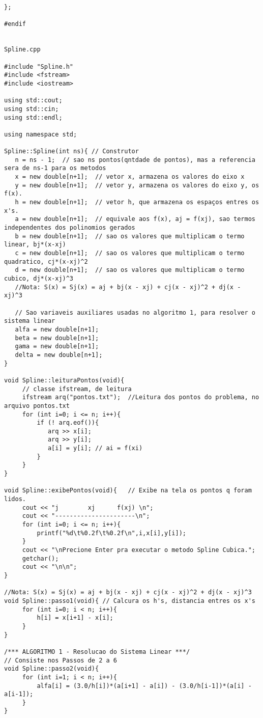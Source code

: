 \begin{verbatim}
};

#endif


Spline.cpp

#include "Spline.h"
#include <fstream>
#include <iostream>

using std::cout;
using std::cin;
using std::endl;

using namespace std;

Spline::Spline(int ns){ // Construtor
   n = ns - 1;  // sao ns pontos(qntdade de pontos), mas a referencia sera de ns-1 para os metodos
   x = new double[n+1];  // vetor x, armazena os valores do eixo x   
   y = new double[n+1];  // vetor y, armazena os valores do eixo y, os f(x).
   h = new double[n+1];  // vetor h, que armazena os espaços entres os x's.
   a = new double[n+1];  // equivale aos f(x), aj = f(xj), sao termos independentes dos polinomios gerados
   b = new double[n+1];  // sao os valores que multiplicam o termo linear, bj*(x-xj)
   c = new double[n+1];  // sao os valores que multiplicam o termo quadratico, cj*(x-xj)^2
   d = new double[n+1];  // sao os valores que multiplicam o termo cubico, dj*(x-xj)^3
   //Nota: S(x) = Sj(x) = aj + bj(x - xj) + cj(x - xj)^2 + dj(x - xj)^3
   
   // Sao variaveis auxiliares usadas no algoritmo 1, para resolver o sistema linear
   alfa = new double[n+1];  
   beta = new double[n+1];
   gama = new double[n+1];
   delta = new double[n+1];
}

void Spline::leituraPontos(void){ 
     // classe ifstream, de leitura
     ifstream arq("pontos.txt");  //Leitura dos pontos do problema, no arquivo pontos.txt
     for (int i=0; i <= n; i++){
         if (! arq.eof()){
            arq >> x[i];
            arq >> y[i];
            a[i] = y[i]; // ai = f(xi)
         }
     }
}

void Spline::exibePontos(void){   // Exibe na tela os pontos q foram lidos.
     cout << "j        xj      f(xj) \n";
     cout << "----------------------\n";
     for (int i=0; i <= n; i++){
         printf("%d\t%0.2f\t%0.2f\n",i,x[i],y[i]);
     }
     cout << "\nPrecione Enter pra executar o metodo Spline Cubica.";
     getchar();
     cout << "\n\n";
}

//Nota: S(x) = Sj(x) = aj + bj(x - xj) + cj(x - xj)^2 + dj(x - xj)^3
void Spline::passo1(void){ // Calcura os h's, distancia entres os x's
     for (int i=0; i < n; i++){
         h[i] = x[i+1] - x[i];
     }
}

/*** ALGORITMO 1 - Resolucao do Sistema Linear ***/
// Consiste nos Passos de 2 a 6
void Spline::passo2(void){ 
     for (int i=1; i < n; i++){
         alfa[i] = (3.0/h[i])*(a[i+1] - a[i]) - (3.0/h[i-1])*(a[i] - a[i-1]);
     }
}


\end{verbatim}
